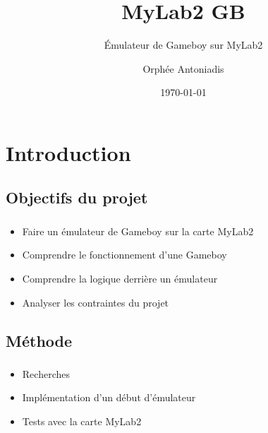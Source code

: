\documentclass{beamer}
\begin{document}

\title{MyLab2 GB}
\subtitle{Émulateur de Gameboy sur MyLab2}
\author{Orphée Antoniadis}
\date{\today}

\begin{frame}
\titlepage
\end{frame}

\begin{frame}
	\setcounter{tocdepth}{1}
	\tableofcontents
\end{frame}


\section{Introduction}
\subsection{Objectifs du projet}
\begin{frame}
	\frametitle{\secname}
	\framesubtitle{\subsecname}
	\begin{itemize}
		\item Faire un émulateur de Gameboy sur la carte MyLab2
		\item Comprendre le fonctionnement d'une Gameboy
    \item Comprendre la logique derrière un émulateur
		\item Analyser les contraintes du projet
	\end{itemize}
\end{frame}


\subsection{Méthode}
\begin{frame}
	\frametitle{\secname}
	\framesubtitle{\subsecname}
	\begin{itemize}
		\item Recherches
		\item Implémentation d'un début d'émulateur
    \item Tests avec la carte MyLab2
	\end{itemize}
\end{frame}
\end{document}
